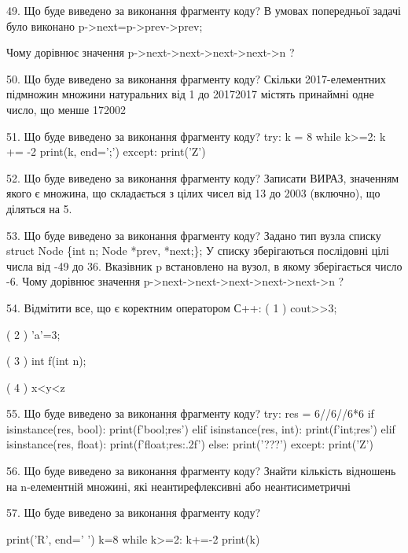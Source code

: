 \documentclass[11pt]{article}
\begin{document}

49. Що буде виведено за виконання фрагменту коду?
В умовах попередньої задачі було виконано p->next=p->prev->prev;

Чому дорівнює значення p->next->next->next->next->n ?

50. Що буде виведено за виконання фрагменту коду?
Скільки 2017-елементних підмножин множини натуральних від 1 до 20172017 містять принаймні одне число, що менше 172002

51. Що буде виведено за виконання фрагменту коду?
try:
    k = 8
    while k>=2:
        k += -2
    print(k, end=';')
except:
    print('Z')


52. Що буде виведено за виконання фрагменту коду?
Записати ВИРАЗ, значенням якого є множина, що складається з цілих чисел від 13 до 2003 (включно), що діляться на 5.

53. Що буде виведено за виконання фрагменту коду?
Задано тип вузла списку
struct Node \{int n; Node *prev, *next;\};
У списку зберігаються послідовні цілі числа від -49 до 36. Вказівник p встановлено на вузол, в якому зберігається число -6.
Чому дорівнює значення p->next->next->next->next->next->n ?

54. %
Відмітити все, що є коректним оператором С++:
( 1 ) cout>>3;

( 2 ) 'a'=3;

( 3 ) int f(int n);

( 4 ) x<y<z


55. Що буде виведено за виконання фрагменту коду?
try:
    res = 6//6//6*6
    if isinstance(res, bool):
        print(f'bool;{res}')
    elif isinstance(res, int):
        print(f'int;{res}')
    elif isinstance(res, float):
        print(f'float;{res:.2f}')
    else:
        print('???')
except:
    print('Z')


56. Що буде виведено за виконання фрагменту коду?
Знайти кількість відношень на n-елементній множині, які неантирефлексивні або неантисиметричні

57. Що буде виведено за виконання фрагменту коду?

print('R', end=' ')
k=8
while k>=2:
    k+=-2
print(k)


\end{document}
